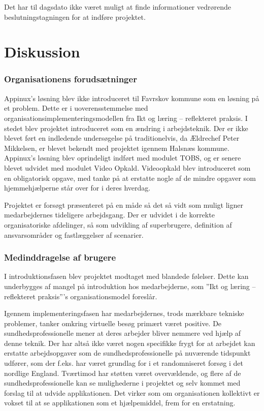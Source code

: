 Det har til dagsdato ikke været muligt at finde informationer vedrørende beslutningstagningen for at indføre projektet.

  
\section{Diskussion}
\subsubsection{Organisationens forudsætninger}
Appinux’s løsning blev ikke introduceret til Favrskov kommune som en løsning på et problem. Dette er i uoverensstemmelse med organisationsimplementeringsmodellen fra Ikt og læring – reflekteret praksis. I stedet blev projektet introduceret som en ændring i arbejdsteknik. Der er ikke blevet ført en indledende undersøgelse på traditionelvis, da Ældrechef Peter Mikkelsen, er blevet bekendt med projektet igennem Halsnæs kommune. Appinux’s løsning blev oprindeligt indført med modulet TOBS, og er senere blevet udvidet med modulet Video Opkald. Videoopkald blev introduceret som en obligatorisk opgave, med tanke på at erstatte nogle af de mindre opgaver som hjemmehjælperne står over for i deres hverdag. 

Projektet er forsøgt præsenteret på en måde så det så vidt som muligt ligner medarbejdernes tideligere arbejdsgang. Der er udvidet i de korrekte organisatoriske afdelinger, så som udvikling af superbrugere, definition af ansvarsområder og fastlæggelser af scenarier. 

\subsubsection{Medinddragelse af brugere}
I introduktionsfasen blev projektet modtaget med blandede følelser. Dette kan underbygges af mangel på introduktion hos medarbejderne, som ”Ikt og læring – reflekteret praksis”’s organisationsmodel foreslår. 

Igennem implementeringsfasen har medarbejdernes, trods mærkbare tekniske problemer, tanker omkring virtuelle besøg primært været positive. De sundhedsprofessionelle mener at deres arbejder bliver nemmere ved hjælp af denne teknik. Der har altså ikke været nogen specifikke frygt for at arbejdet kan erstatte arbejdsopgaver som de sundhedsprofessionelle på nuværende tidspunkt udfører, som der f.eks. har været grundlag for i et randomniseret forsøg i det nordlige England\cite{Mair}. Tværtimod har støtten været overvældende, og flere af de sundhedsprofessionelle kan se mulighederne i projektet og selv kommet med forslag til at udvide applikationen. Det virker som om organisationen kollektivt er vokset til at se applikationen som et hjælpemiddel, frem for en erstatning.

